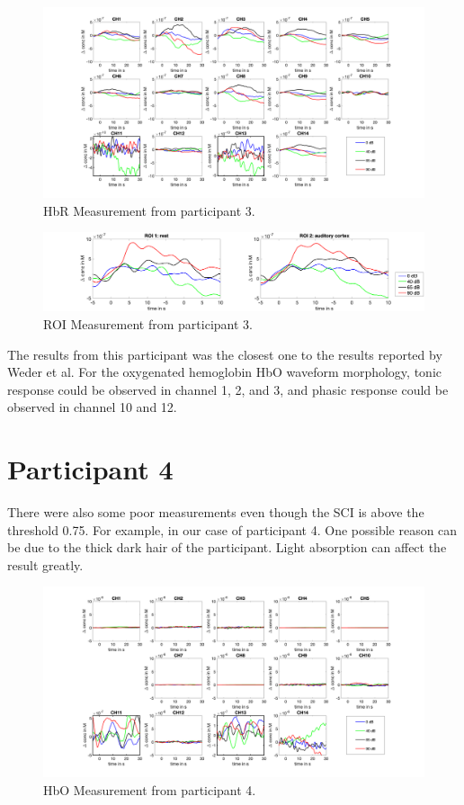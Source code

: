 \begin{figure}[H]
  \centering
    \includegraphics[scale=.4]{bilder/HbR_Mole/sub_jonas_s_HbR.png}
  \caption{HbR Measurement from participant 3.}
  \label{fig:somesignal}
\end{figure}

\begin{figure}[H]
  \centering
    \includegraphics[scale=.3]{bilder/ROI/sub_jonas_s_HbO.png}
  \caption{ROI Measurement from participant  3.}
\end{figure}

The results from this participant was the closest one to the results reported by Weder et al. For the oxygenated hemoglobin HbO waveform morphology, tonic response could be observed in channel 1, 2, and 3, and phasic response could be observed in channel 10 and 12.

\newpage


\section {Participant 4}
There were also some poor measurements even though the SCI is above the threshold 0.75. For example, in our case of participant 4. One possible reason can be due to the thick dark hair of the participant. Light absorption can affect the result greatly.

\begin{figure}[H]
  \centering
    \includegraphics[scale=.35]{bilder/HbO_Mole/sub_lin_s_HbO.png}
  \caption{HbO Measurement from participant 4.}
\end{figure}


